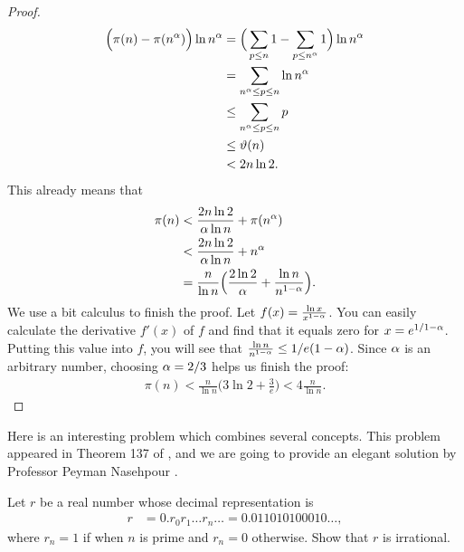 \begin{proof}
\begin{align*}
				\Big(\pi(n) - \pi(n^{\alpha})\Big) \ln n^{\alpha} &= \Big(\sum_{p \leq n} 1 - \sum_{p \leq n^{
						\alpha}} 1\Big) \ln n^{\alpha}\\
														  &=\sum_{n^{\alpha} \leq p \leq n} \ln n^{\alpha}\\
														  &\leq \sum_{n^{\alpha} \leq p \leq n} p\\
														  &\leq \vartheta(n)\\
														  &< 2n \ln 2.
			\end{align*}
		This already means that
			\begin{align*}
				\pi(n) &< \frac{2n \ln 2}{\alpha \ln n} + \pi(n^{\alpha})\\
					   &< \frac{2n \ln 2}{\alpha \ln n} + n^{\alpha}\\
					   &= \frac{n}{\ln n} \Big(\frac{2 \ln 2}{\alpha} + \frac{\ln n}{n^{1-\alpha}} \Big).
			\end{align*}
		We use a bit calculus to finish the proof. Let $ f(x)=\frac{\ln x}{x^{1-\alpha}}$. You can easily calculate the derivative $f'(x)$ of $f$ and find that it equals zero for $x=e^{1/1-\alpha}$. Putting this value into $f$, you will see that $\frac{\ln n}{n^{1-\alpha}} \leq 1/e(1-\alpha)$. Since $\alpha$ is an arbitrary number, choosing $\alpha = 2/3$ helps us finish the proof:
			\begin{align*}
				\pi(n) < \frac{n}{\ln n} \Big(3 \ln 2 + \frac{3}{e} \Big)< 4 \frac{n}{\ln n}.
			\end{align*}
	\end{proof}


Here is an interesting problem which combines several concepts. This problem appeared in Theorem 137 of \cite{ch:primes-hardy}, and we are going to provide an elegant solution by Professor Peyman Nasehpour \cite{ch:primes-nasehpour}.
\begin{problem}\label{prob:nasehpour}
	Let $r$ be a real number whose decimal representation is
	\begin{align*}
	r & = 0.r_0r_1\ldots r_n \ldots = 0.011010100010\ldots,
	\end{align*}
	where $r_n=1$ if when $n$ is prime and $r_n=0$ otherwise. Show that $r$ is irrational.
\end{problem}

